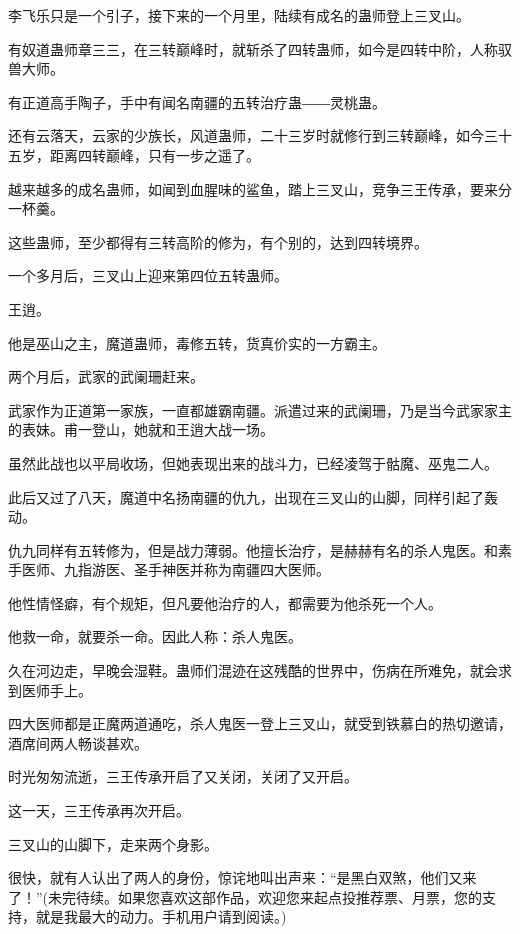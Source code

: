 \begin{this_body}
李飞乐只是一个引子，接下来的一个月里，陆续有成名的蛊师登上三叉山。

有奴道蛊师章三三，在三转巅峰时，就斩杀了四转蛊师，如今是四转中阶，人称驭兽大师。

有正道高手陶子，手中有闻名南疆的五转治疗蛊――灵桃蛊。

还有云落天，云家的少族长，风道蛊师，二十三岁时就修行到三转巅峰，如今三十五岁，距离四转巅峰，只有一步之遥了。

越来越多的成名蛊师，如闻到血腥味的鲨鱼，踏上三叉山，竞争三王传承，要来分一杯羹。

这些蛊师，至少都得有三转高阶的修为，有个别的，达到四转境界。

一个多月后，三叉山上迎来第四位五转蛊师。

王逍。

他是巫山之主，魔道蛊师，毒修五转，货真价实的一方霸主。

两个月后，武家的武阑珊赶来。

武家作为正道第一家族，一直都雄霸南疆。派遣过来的武阑珊，乃是当今武家家主的表妹。甫一登山，她就和王逍大战一场。

虽然此战也以平局收场，但她表现出来的战斗力，已经凌驾于骷魔、巫鬼二人。

此后又过了八天，魔道中名扬南疆的仇九，出现在三叉山的山脚，同样引起了轰动。

仇九同样有五转修为，但是战力薄弱。他擅长治疗，是赫赫有名的杀人鬼医。和素手医师、九指游医、圣手神医并称为南疆四大医师。

他性情怪癖，有个规矩，但凡要他治疗的人，都需要为他杀死一个人。

他救一命，就要杀一命。因此人称：杀人鬼医。

久在河边走，早晚会湿鞋。蛊师们混迹在这残酷的世界中，伤病在所难免，就会求到医师手上。

四大医师都是正魔两道通吃，杀人鬼医一登上三叉山，就受到铁慕白的热切邀请，酒席间两人畅谈甚欢。

时光匆匆流逝，三王传承开启了又关闭，关闭了又开启。

这一天，三王传承再次开启。

三叉山的山脚下，走来两个身影。

很快，就有人认出了两人的身份，惊诧地叫出声来：“是黑白双煞，他们又来了！”(未完待续。如果您喜欢这部作品，欢迎您来起点投推荐票、月票，您的支持，就是我最大的动力。手机用户请到阅读。)

\end{this_body}

